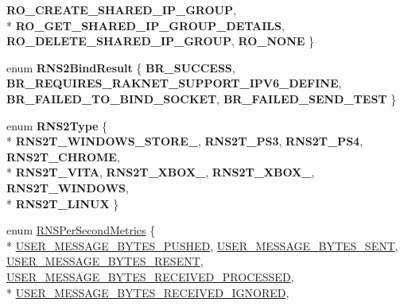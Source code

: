 \begin{DoxyCompactItemize}
{\bfseries R\-O\-\_\-\-C\-R\-E\-A\-T\-E\-\_\-\-S\-H\-A\-R\-E\-D\-\_\-\-I\-P\-\_\-\-G\-R\-O\-U\-P}, 
\\*
{\bfseries R\-O\-\_\-\-G\-E\-T\-\_\-\-S\-H\-A\-R\-E\-D\-\_\-\-I\-P\-\_\-\-G\-R\-O\-U\-P\-\_\-\-D\-E\-T\-A\-I\-L\-S}, 
{\bfseries R\-O\-\_\-\-D\-E\-L\-E\-T\-E\-\_\-\-S\-H\-A\-R\-E\-D\-\_\-\-I\-P\-\_\-\-G\-R\-O\-U\-P}, 
{\bfseries R\-O\-\_\-\-N\-O\-N\-E}
 \}
\item 
enum {\bfseries R\-N\-S2\-Bind\-Result} \{ {\bfseries B\-R\-\_\-\-S\-U\-C\-C\-E\-S\-S}, 
{\bfseries B\-R\-\_\-\-R\-E\-Q\-U\-I\-R\-E\-S\-\_\-\-R\-A\-K\-N\-E\-T\-\_\-\-S\-U\-P\-P\-O\-R\-T\-\_\-\-I\-P\-V6\-\_\-\-D\-E\-F\-I\-N\-E}, 
{\bfseries B\-R\-\_\-\-F\-A\-I\-L\-E\-D\-\_\-\-T\-O\-\_\-\-B\-I\-N\-D\-\_\-\-S\-O\-C\-K\-E\-T}, 
{\bfseries B\-R\-\_\-\-F\-A\-I\-L\-E\-D\-\_\-\-S\-E\-N\-D\-\_\-\-T\-E\-S\-T}
 \}
\item 
enum {\bfseries R\-N\-S2\-Type} \{ \\*
{\bfseries R\-N\-S2\-T\-\_\-\-W\-I\-N\-D\-O\-W\-S\-\_\-\-S\-T\-O\-R\-E\-\_}, 
{\bfseries R\-N\-S2\-T\-\_\-\-P\-S3}, 
{\bfseries R\-N\-S2\-T\-\_\-\-P\-S4}, 
{\bfseries R\-N\-S2\-T\-\_\-\-C\-H\-R\-O\-M\-E}, 
\\*
{\bfseries R\-N\-S2\-T\-\_\-\-V\-I\-T\-A}, 
{\bfseries R\-N\-S2\-T\-\_\-\-X\-B\-O\-X\-\_}, 
{\bfseries R\-N\-S2\-T\-\_\-\-X\-B\-O\-X\-\_}, 
{\bfseries R\-N\-S2\-T\-\_\-\-W\-I\-N\-D\-O\-W\-S}, 
\\*
{\bfseries R\-N\-S2\-T\-\_\-\-L\-I\-N\-U\-X}
 \}
\item 
enum \hyperlink{namespace_rak_net_ada2bfa976ee507869dc9f3ef0c11134d}{R\-N\-S\-Per\-Second\-Metrics} \{ \\*
\hyperlink{namespace_rak_net_ada2bfa976ee507869dc9f3ef0c11134daa2cd98618c14f2d602ac87aca51650a0}{U\-S\-E\-R\-\_\-\-M\-E\-S\-S\-A\-G\-E\-\_\-\-B\-Y\-T\-E\-S\-\_\-\-P\-U\-S\-H\-E\-D}, 
\hyperlink{namespace_rak_net_ada2bfa976ee507869dc9f3ef0c11134da66f1e463d1a8eeaef206c1c3003b3a31}{U\-S\-E\-R\-\_\-\-M\-E\-S\-S\-A\-G\-E\-\_\-\-B\-Y\-T\-E\-S\-\_\-\-S\-E\-N\-T}, 
\hyperlink{namespace_rak_net_ada2bfa976ee507869dc9f3ef0c11134da3bdf5c0cfdca6357df295056fb81a1cc}{U\-S\-E\-R\-\_\-\-M\-E\-S\-S\-A\-G\-E\-\_\-\-B\-Y\-T\-E\-S\-\_\-\-R\-E\-S\-E\-N\-T}, 
\hyperlink{namespace_rak_net_ada2bfa976ee507869dc9f3ef0c11134dab645a576306d6b0d96a2db30acc90d1c}{U\-S\-E\-R\-\_\-\-M\-E\-S\-S\-A\-G\-E\-\_\-\-B\-Y\-T\-E\-S\-\_\-\-R\-E\-C\-E\-I\-V\-E\-D\-\_\-\-P\-R\-O\-C\-E\-S\-S\-E\-D}, 
\\*
\hyperlink{namespace_rak_net_ada2bfa976ee507869dc9f3ef0c11134da3e5ae1af8a1c683e89c9b0500403a0ca}{U\-S\-E\-R\-\_\-\-M\-E\-S\-S\-A\-G\-E\-\_\-\-B\-Y\-T\-E\-S\-\_\-\-R\-E\-C\-E\-I\-V\-E\-D\-\_\-\-I\-G\-N\-O\-R\-E\-D}, 

\end{DoxyCompactItemize}
